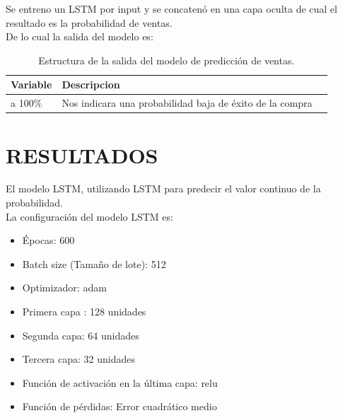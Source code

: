 \documentclass[conference]{IEEEtran}
\begin{document}
Se entreno un LSTM por input y se concatenó en una capa oculta de cual el resultado es la probabilidad de ventas.\\
De lo cual la salida del modelo es:
\begin{table}[h]
    \caption{Estructura de la salida del modelo de predicción de ventas.}
    \centering
    \begin{tabularx}{0.4\textwidth} {
            | >{\raggedright\arraybackslash}X
            | >{\centering\arraybackslash}X
            | >{\raggedleft\arraybackslash}X |}
        \hline
        Variable              & Descripcion                             \\
        \hline
        0 a 100\%        & Nos indicara una probabilidad baja de éxito de la compra        \\
        \hline
    \end{tabularx}
    \label{tab3}
\end{table}
\section{RESULTADOS}
El modelo LSTM, utilizando LSTM para predecir el valor continuo de la probabilidad.\\

La configuración del modelo LSTM es:
\begin{itemize}
\item Épocas: 600
\item Batch size (Tamaño de lote): 512
\item Optimizador: adam
\item Primera capa : 128 unidades
\item Segunda capa: 64 unidades
\item Tercera capa: 32 unidades
\item Función de activación en la última capa: relu
\item Función de pérdidas: Error cuadrático medio
\end{itemize}
\end{document}
